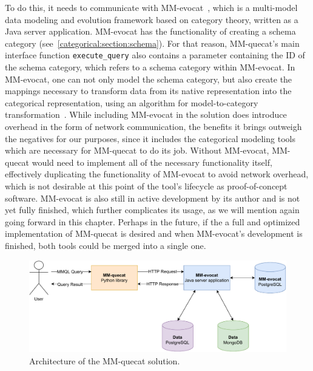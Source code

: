 To do this, it needs to communicate with MM-evocat~\cite{evocat}, which is a multi-model data modeling and evolution framework based on category theory, written as a Java server application.
MM-evocat has the functionality of creating a schema category (see~\cref{categorical:section:schema}).
For that reason, MM-quecat's main interface function \texttt{execute\_query} also contains a parameter containing the ID of the schema category, which refers to a schema category within MM-evocat.
In MM-evocat, one can not only model the schema category, but also create the mappings necessary to transform data from its native representation into the categorical representation, using an algorithm for model-to-category transformation~\cite{unified_representation}.
While including MM-evocat in the solution does introduce overhead in the form of network communication, the benefits it brings outweigh the negatives for our purposes, since it includes the categorical modeling tools which are necessary for MM-quecat to do its job.
Without MM-evocat, MM-quecat would need to implement all of the necessary functionality itself, effectively duplicating the functionality of MM-evocat to avoid network overhead, which is not desirable at this point of the tool's lifecycle as proof-of-concept software.
MM-evocat is also still in active development by its author and is not yet fully finished, which further complicates its usage, as we will mention again going forward in this chapter.
Perhaps in the future, if the a full and optimized implementation of MM-quecat is desired and when MM-evocat's development is finished, both tools could be merged into a single one.

\begin{figure}[h]
\centering
\includegraphics[width=\textwidth]{img/quecat-architecture.pdf} 
\caption{Architecture of the MM-quecat solution.}
\label{fig:quecatarchitecture}
\end{figure}

